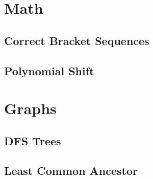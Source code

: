 \documentclass[12pt]{article}
\begin{document}
\section{Math}

\subsection{Correct Bracket Sequences}


\subsection{Polynomial Shift}



\section{Graphs}

\subsection{DFS Trees}


\subsection{Least Common Ancestor}

\end{document}
